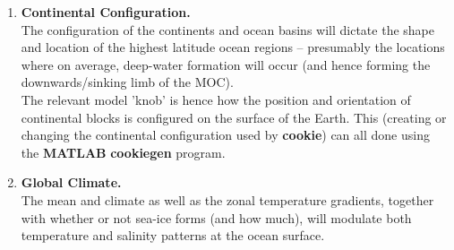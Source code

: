 \vspace{1mm}
\begin{enumerate}
\vspace{1mm}
\item \textbf{Continental Configuration.}
\\The configuration of the continents and ocean basins will dictate the shape and location of the highest latitude ocean regions -- presumably the locations where on average, deep-water formation will occur (and hence forming the downwards/sinking limb of the MOC).
\\The relevant model 'knob' is hence how the position and orientation of continental blocks is configured on the surface of the Earth. This (creating or changing the continental configuration used by \textbf{cookie}) can all done using the \textbf{MATLAB} \textbf{cookiegen} program.
\vspace{1mm}
\item \textbf{Global Climate.}
\\The mean and climate as well as the zonal temperature gradients, together with whether or not sea-ice forms (and how much), will modulate both temperature and salinity patterns at the ocean surface.


\end{enumerate}
